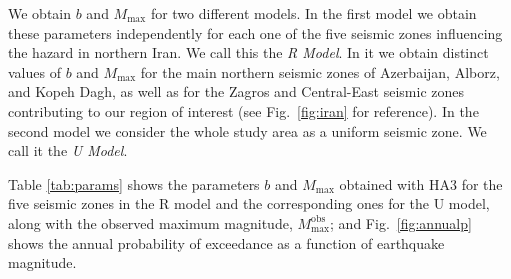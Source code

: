 We obtain $b$ and $M_{\max}$ for two different models. In the first model we obtain these parameters independently for each one of the five seismic zones influencing the hazard in northern Iran. We call this the \textit{R Model}. In it we obtain distinct values of $b$ and $M_{\max}$ for the main northern seismic zones of Azerbaijan, Alborz, and Kopeh Dagh, as well as for the Zagros and Central-East seismic zones contributing to our region of interest (see Fig.~\ref{fig:iran} for reference). In the second model we consider the whole study area as a uniform seismic zone. We call it the \textit{U Model}. 

Table \ref{tab:params} shows the parameters $b$ and $M_{\max}$ obtained with HA3 for the five seismic zones in the R model and the corresponding ones for the U model, along with the observed maximum magnitude, $M_{\max}^{\mathrm{obs}}$; and Fig.~\ref{fig:annualp} shows the annual probability of exceedance as a function of earthquake magnitude.

